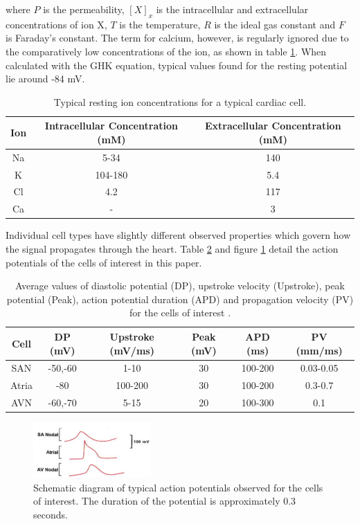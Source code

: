 where $P$ is the permeability, $[X]_x$ is the intracellular and extracellular concentrations of ion X, $T$ is the temperature, $R$ is the ideal gas constant and $F$ is Faraday's constant. The term for calcium, however, is regularly ignored due to the comparatively low concentrations of the ion, as shown in table \ref{table2.1}. When calculated with the GHK equation, typical values found for the resting potential lie around -84 mV. \par
\begin{table}[h!]
\centering
 \begin{tabular}{||c c c||} 
 \hline
 Ion & Intracellular Concentration (mM) & Extracellular Concentration (mM) \\ [0.5ex] 
 \hline\hline
 Na & 5-34 & 140 \\ 
 \hline
 K & 104-180 & 5.4 \\
 \hline
 Cl & 4.2 & 117 \\
 \hline
 Ca & - & 3 \\
 \hline
\end{tabular}
\caption{Typical resting ion concentrations for a typical cardiac cell. \citep{ionconc}}
\label{table2.1}
\end{table}
Individual cell types have slightly different observed properties which govern how the signal propagates through the heart. Table \ref{table2.2} and figure \ref{fig2.7} detail the action potentials of the cells of interest in this paper.
\begin{table}[h!]
\centering
 \begin{tabular}{||c c c c c c||} 
 \hline
 Cell & DP (mV) & Upstroke (mV/ms) & Peak (mV) & APD (ms) & PV (mm/ms) \\ [0.5ex] 
 \hline\hline
 SAN & -50,-60 & 1-10 & 30 & 100-200 & 0.03-0.05 \\ 
 \hline
 Atria & -80 & 100-200 & 30 & 100-200 & 0.3-0.7 \\
 \hline
 AVN & -60,-70 & 5-15 & 20 & 100-300 & 0.1 \\
 \hline
\end{tabular}
\caption{Average values of diastolic potential (DP), upstroke velocity (Upstroke), peak potential (Peak), action potential duration (APD) and propagation velocity (PV) for the cells of interest \citep{ecg}.}
\label{table2.2}
\end{table}
\begin{figure}
    \centering
    \includegraphics[width=0.4\textwidth]{images/cardiacactionpotentialregions.png}
    \caption{Schematic diagram of typical action potentials observed for the cells of interest. The duration of the potential is approximately 0.3 seconds. \citep{ecg}}
    \label{fig2.7}
\end{figure}

